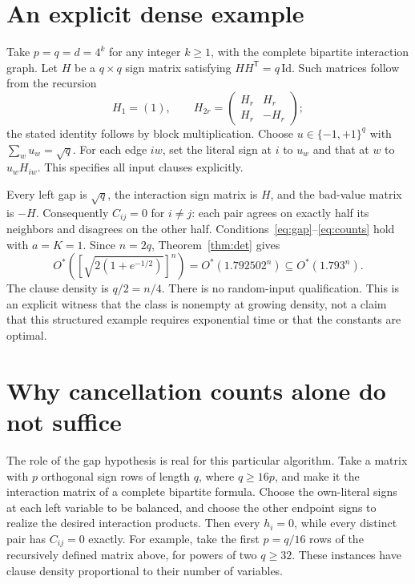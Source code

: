 \documentclass[11pt,a4paper]{article}
\newcommand{\Ostar}{O^{*}}
\begin{document}
\section{An explicit dense example}

Take $p=q=d=4^k$ for any integer $k\ge1$, with the complete bipartite
interaction graph. Let $H$ be a $q\times q$ sign matrix satisfying
$HH^{\mathsf T}=q\,\mathrm{Id}$. Such matrices follow from the recursion
\[
 H_1=(1),\qquad
 H_{2r}=\begin{pmatrix}H_r&H_r\\H_r&-H_r\end{pmatrix};
\]
the stated identity follows by block multiplication.
Choose $u\in\{-1,+1\}^q$ with $\sum_wu_w=\sqrt q$.
For each edge $iw$, set the literal sign at $i$ to $u_w$ and that
at $w$ to $u_wH_{iw}$. This specifies all input clauses explicitly.

Every left gap is $\sqrt q$, the interaction sign matrix is $H$, and
the bad-value matrix is $-H$. Consequently $C_{ij}=0$ for $i\ne j$:
each pair agrees on exactly half its neighbors and disagrees on the
other half. Conditions~\eqref{eq:gap}--\eqref{eq:counts} hold with
$a=K=1$. Since $n=2q$, Theorem~\ref{thm:det} gives
\[
 \Ostar\left(\left[\sqrt{2(1+e^{-1/2})}\right]^n\right)
 =\Ostar(1.792502^n)\subseteq\Ostar(1.793^n).
\]
The clause density is $q/2=n/4$. There is no random-input qualification.
This is an explicit witness that the class is nonempty at growing
density, not a claim that this structured example requires exponential
time or that the constants are optimal.

\section{Why cancellation counts alone do not suffice}

The role of the gap hypothesis is real for this particular algorithm.
Take a matrix with $p$ orthogonal sign rows of length $q$, where
$q\ge16p$, and make it the interaction matrix of a complete bipartite
formula. Choose the own-literal signs at each left variable to be
balanced, and choose the other endpoint signs to realize the desired
interaction products. Then every $h_i=0$, while every distinct pair
has $C_{ij}=0$ exactly. For example, take the first $p=q/16$ rows of
the recursively defined matrix above, for powers of two $q\ge32$.
These instances have clause density proportional to their number of
variables.
\end{document}
